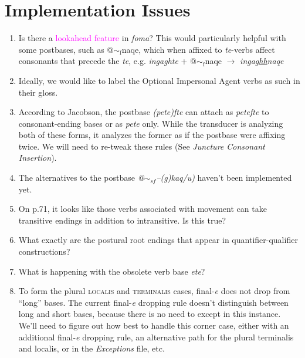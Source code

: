 \documentclass{article}
\begin{document}
\section{Implementation Issues}

\begin{enumerate}

\item Is there a \textcolor{magenta}{lookahead feature} in \textit{foma}? This would particularly helpful with some postbases, such as @${\sim}_\text{f}$naqe, which when affixed to \textit{te}-verbs affect consonants that precede the \textit{te}, e.g. \textit{ingaghte} + @${\sim}_\text{f}$naqe $\rightarrow$ \textit{inga\uline{ghh}naqe}

\item Ideally, we would like to label the Optional Impersonal Agent verbs as such in their gloss.

\item According to Jacobson, the postbase \textit{(pete)fte} can attach as \textit{petefte} to consonant-ending bases or as \textit{pete} only.
%
While the transducer is analyzing both of these forms, it analyzes the former as if the postbase were affixing twice.
%
We will need to re-tweak these rules (See \textit{Juncture Consonant Insertion}).

\item The alternatives to the postbase \textit{@$\sim_{sf}$--(g)kaq/u)} haven't been implemented yet.

\item On p.71, it looks like those verbs associated with movement can take transitive endings in addition to intransitive.
%
Is this true?

\item What exactly are the postural root endings that appear in quantifier-qualifier constructions?

\item What is happening with the obsolete verb base \textit{ete}?

\item To form the plural \textsc{localis} and \textsc{terminalis} cases, final-\textit{e} does not drop from ``long'' bases.
%
The current final-\textit{e} dropping rule doesn't distinguish between long and short bases, because there is no need to except in this instance.
%
We'll need to figure out how best to handle this corner case, either with an additional final-\textit{e} dropping rule, an alternative path for the plural terminalis and localis, or in the \textit{Exceptions} file, etc.


\end{enumerate}
\end{document}
